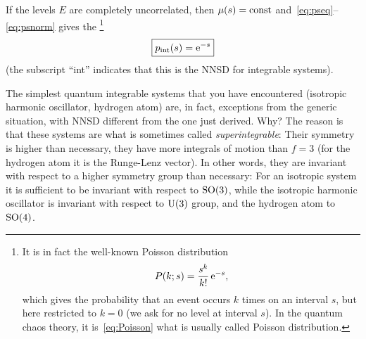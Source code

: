 \documentclass[a4paper,11pt,twoside]{article}
\begin{document}
        If the levels $E$ are completely uncorrelated, then $\mu(s)=\mathrm{const}$ and~\eqref{eq:pseq}--\eqref{eq:psnorm} gives the \footnote{It is in fact the well-known Poisson distribution
        \begin{equation}
            P(k;s)=\frac{s^{k}}{k!}\operatorname{e}^{-s},
        \end{equation}
        which gives the probability that an event occurs $k$ times on an interval $s$, but here restricted to $k=0$ (we ask for no level at interval $s$).
        In the quantum chaos theory, it is~\eqref{eq:Poisson} what is usually called Poisson distribution.}   
        \begin{equation}
            \label{eq:Poisson}
            \boxed{p_{\text{int}}(s)=\operatorname{e}^{-s}}
        \end{equation}
        (the subscript ``int'' indicates that this is the NNSD for integrable systems).
        
        The simplest quantum integrable systems that you have encountered (isotropic harmonic oscillator, hydrogen atom) are, in fact, exceptions from the generic situation, with NNSD different from the one just derived. 
        Why? 
        The reason is that these systems are what is sometimes called \emph{superintegrable}: Their symmetry is higher than necessary, they have more integrals of motion than $f=3$ (for the hydrogen atom it is the Runge-Lenz vector).
        In other words, they are invariant with respect to a higher symmetry group than necessary: For an isotropic system it is sufficient to be invariant with respect to $\mathrm{SO(3)}$, while the isotropic harmonic oscillator is invariant with respect to $\mathrm{U(3)}$ group, and the hydrogen atom to $\mathrm{SO(4)}$.
\end{document}
